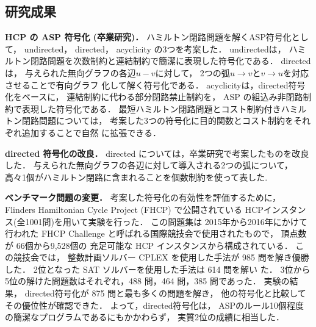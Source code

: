 \documentclass[a4j,10pt]{jarticle}
\begin{document}
\begin{multicols}{1}
\section{研究成果}
\textbf{HCP の ASP 符号化 (卒業研究)．}
ハミルトン閉路問題を解くASP符号化として，
\textsf{undirected}，
\textsf{directed}，
\textsf{acyclicity}
の3つを考案した．
\textsf{undirected}は，
ハミルトン閉路問題を次数制約と連結制約で簡潔に表現した符号化である．
\textsf{directed}は，
与えられた無向グラフの各辺$u-v$に対して，
2つの弧$u\rightarrow v$と$v\rightarrow u$を対応させることで有向グラフ
化して解く符号化である．
\textsf{acyclicity}は，\textsf{directed}符号化をベースに，
連結制約に代わる部分閉路禁止制約を，
ASP の組込み非閉路制約で表現した符号化である．
最短ハミルトン閉路問題とコスト制約付きハミルトン閉路問題については，
考案した3つの符号化に目的関数とコスト制約をそれぞれ追加することで自然
に拡張できる．

\textbf{directed 符号化の改良．}
\textsf{directed} については，卒業研究で考案したものを改良した．
与えられた無向グラフの各辺に対して導入される2つの弧について，
高々1個がハミルトン閉路に含まれることを個数制約を使って表した.

\textbf{ベンチマーク問題の変更．}
考案した符号化の有効性を評価するために，
Flinders Hamiltonian Cycle Project (FHCP) で公開されている
HCPインスタンス(全1001問)を用いて実験を行った．
この問題集は 2015年から2016年にかけて行われた 
FHCP Challenge と呼ばれる国際競技会で使用されたもので，
頂点数が 66個から9,528個の 充足可能な HCP インスタンスから構成されている．
この競技会では，
整数計画ソルバー CPLEX を使用した手法が 985
問を解き優勝した．
2位となった SAT ソルバーを使用した手法は 614 問を解い
た．
3位から5位の解けた問題数はそれぞれ，488 問，464 問，385 問であった．
実験の結果，
\textsf{directed}符号化が 875 問と最も多くの問題を解き，
他の符号化と比較してその優位性が確認できた．
よって，\textsf{directed}符号化は，
ASPのルール10個程度の簡潔なプログラムであるにもかかわらず，
実質2位の成績に相当した．


\end{multicols}
\end{document}

